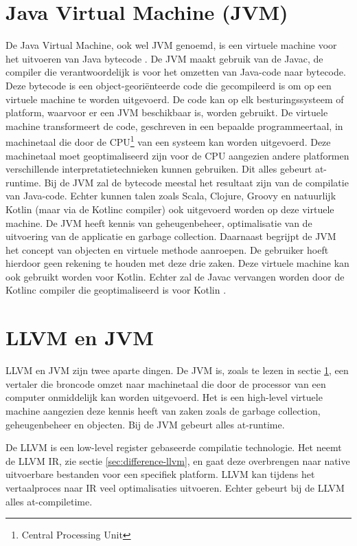 \section{Java Virtual Machine (JVM)}
\label{sec:jvm}
De Java Virtual Machine, ook wel JVM genoemd, is een virtuele machine voor het uitvoeren van Java bytecode \autocite{TechopediaBytecode}. De JVM maakt gebruik van de Javac, de compiler die verantwoordelijk is voor het omzetten van Java-code naar bytecode. Deze bytecode is een object-georiënteerde code die gecompileerd is om op een virtuele machine te worden uitgevoerd. De code kan op elk besturingssysteem of platform, waarvoor er een JVM beschikbaar is, worden gebruikt. De virtuele machine transformeert de code, geschreven in een bepaalde programmeertaal, in machinetaal die door de CPU\footnote{Central Processing Unit} van een systeem kan worden uitgevoerd. Deze machinetaal moet geoptimaliseerd zijn voor de CPU aangezien andere platformen verschillende interpretatietechnieken kunnen gebruiken. Dit alles gebeurt at-runtime. Bij de JVM zal de bytecode meestal het resultaat zijn van de compilatie van Java-code. Echter kunnen talen zoals Scala, Clojure, Groovy en natuurlijk Kotlin (maar via de Kotlinc compiler) ook uitgevoerd worden op deze virtuele machine. De JVM heeft kennis van geheugenbeheer, optimalisatie van de uitvoering van de applicatie en garbage collection. Daarnaast begrijpt de JVM het concept van objecten en virtuele methode aanroepen. De gebruiker hoeft hierdoor geen rekening te houden met deze drie zaken. Deze virtuele machine kan ook gebruikt worden voor Kotlin. Echter zal de Javac vervangen worden door de Kotlinc compiler die geoptimaliseerd is voor Kotlin \autocite{TechopediaJVM}. 

\section{LLVM en JVM}
LLVM en JVM zijn twee aparte dingen. De JVM is, zoals te lezen in sectie \ref{sec:jvm}, een vertaler die broncode omzet naar machinetaal die door de processor van een computer onmiddelijk kan worden uitgevoerd. Het is een high-level virtuele machine aangezien deze kennis heeft van zaken zoals de garbage collection, geheugenbeheer en objecten. Bij de JVM gebeurt alles at-runtime. 

De LLVM is een low-level register gebaseerde compilatie technologie. Het neemt de LLVM IR, zie sectie \ref{sec:difference-llvm}, en gaat deze overbrengen naar native uitvoerbare bestanden voor een specifiek platform. LLVM kan tijdens het vertaalproces naar IR veel optimalisaties uitvoeren. Echter gebeurt bij de LLVM alles at-compiletime.
